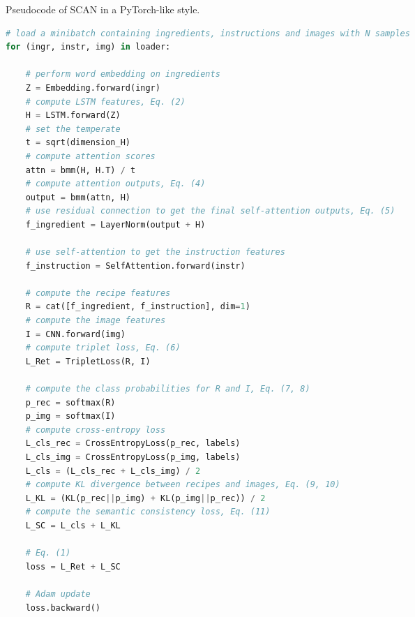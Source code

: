 \documentclass[journal]{IEEEtran}
\makeatletter
\let\@algcomment\relax
\newcommand\algcomment[1]{\def\@algcomment{\footnotesize#1}}
\makeatother
\begin{document}
\begin{algorithm}[t]
\caption{Pseudocode of SCAN in a PyTorch-like style.}
\label{alg:code}
\algcomment{\fontsize{7.2pt}{0em}\selectfont \texttt{sqrt}: square root; \texttt{bmm}: batch matrix multiplication; \texttt{cat}: concatenation.
}
\begin{lstlisting}[language=python]
# load a minibatch containing ingredients, instructions and images with N samples
for (ingr, instr, img) in loader:
    
    # perform word embedding on ingredients
    Z = Embedding.forward(ingr)
    # compute LSTM features, Eq. (2)
    H = LSTM.forward(Z)
    # set the temperate
    t = sqrt(dimension_H)
    # compute attention scores 
    attn = bmm(H, H.T) / t
    # compute attention outputs, Eq. (4)
    output = bmm(attn, H)
    # use residual connection to get the final self-attention outputs, Eq. (5)
    f_ingredient = LayerNorm(output + H)
    
    # use self-attention to get the instruction features
    f_instruction = SelfAttention.forward(instr)
    
    # compute the recipe features
    R = cat([f_ingredient, f_instruction], dim=1)
    # compute the image features
    I = CNN.forward(img)
    # compute triplet loss, Eq. (6)
    L_Ret = TripletLoss(R, I)
    
    # compute the class probabilities for R and I, Eq. (7, 8)
    p_rec = softmax(R)
    p_img = softmax(I)
    # compute cross-entropy loss
    L_cls_rec = CrossEntropyLoss(p_rec, labels)
    L_cls_img = CrossEntropyLoss(p_img, labels)
    L_cls = (L_cls_rec + L_cls_img) / 2
    # compute KL divergence between recipes and images, Eq. (9, 10)
    L_KL = (KL(p_rec||p_img) + KL(p_img||p_rec)) / 2 
    # compute the semantic consistency loss, Eq. (11)
    L_SC = L_cls + L_KL
    
    # Eq. (1)
    loss = L_Ret + L_SC

    # Adam update
    loss.backward()
\end{lstlisting}
\end{algorithm}
\end{document}
